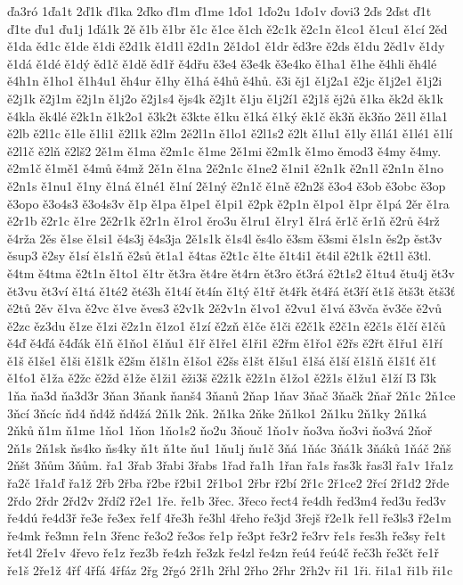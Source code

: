 {ďa3ró
1ďa1t
2ď1k
ď1ka
2ďko
ď1m
ď1me
1ďo1
1ďo2u
1ďo1v
ďovi3
2ďs
2ďst
ď1t
ď1te
ďu1
ďu1j
1ďá1k
2ě
ě1b
ě1br
ě1c
ě1ce
ě1ch
ě2c1k
ě2c1n
ě1co1
ě1cu1
ě1cí
2ěd
ě1da
ěd1c
ě1de
ě1di
ě2d1k
ě1d1l
ě2d1n
2ě1do1
ě1dr
ěd3re
ě2ds
ě1du
2ěd1v
ě1dy
ě1dá
ě1dé
ě1dý
ěd1č
ě1dě
ěd1ř
ě4dřu
ě3e4
ě3e4k
ě3e4ko
ě1ha1
ě1he
ě4hli
ěh4lé
ě4h1n
ě1ho1
ě1h4u1
ěh4ur
ě1hy
ě1há
ě4hů
ě4hů.
ě3i
ěj1
ě1j2a1
ě2jc
ě1j2e1
ě1j2i
ě2j1k
ě2j1m
ě2j1n
ě1j2o
ě2j1s4
ějs4k
ě2j1t
ě1ju
ě1j2í1
ě2j1š
ěj2ů
ě1ka
ěk2d
ěk1k
ě4kla
ěk4lé
ě2k1n
ě1k2o1
ě3k2t
ě3kte
ě1ku
ě1ká
ě1ký
ěk1č
ěk3ň
ěk3ňo
2ě1l
ě1la1
ě2lb
ě2l1c
ě1le
ě1li1
ě2l1k
ě2lm
2ě2l1n
ě1lo1
ě2l1s2
ě2lt
ě1lu1
ě1ly
ě1lá1
ě1lé1
ě1lí
ě2l1č
ě2lň
ě2lš2
2ě1m
ě1ma
ě2m1c
ě1me
2ě1mi
ě2m1k
ě1mo
ěmod3
ě4my
ě4my.
ě2m1č
ě1mě1
ě4mů
ě4mž
2ě1n
ě1na
2ě2n1c
ě1ne2
ě1ni1
ě2n1k
ě2n1l
ě2n1n
ě1no
ě2n1s
ě1nu1
ě1ny
ě1ná
ě1né1
ě1ní
2ě1ný
ě2n1č
ě1ně
ě2n2š
ě3o4
ě3ob
ě3obc
ě3op
ě3opo
ě3o4s3
ě3o4s3v
ě1p
ě1pa
ě1pe1
ě1pi1
ě2pk
ě2p1n
ě1po1
ě1pr
ě1pá
2ěr
ě1ra
ě2r1b
ě2r1c
ě1re
2ě2r1k
ě2r1n
ě1ro1
ěro3u
ě1ru1
ě1ry1
ě1rá
ěr1č
ěr1ň
ě2rů
ě4rž
ě4rža
2ěs
ě1se
ě1si1
ě4s3j
ě4s3ja
2ě1s1k
ě1s4l
ěs4lo
ě3sm
ě3smi
ě1s1n
ěs2p
ěst3v
ěsup3
ě2sy
ě1sí
ě1s1ň
ě2sů
ět1a1
ě4tas
ě2t1c
ě1te
ě1t4i1
ět4il
ě2t1k
ě2t1l
ě3tl.
ě4tm
ě4tma
ě2t1n
ě1to1
ě1tr
ět3ra
ět4re
ět4rn
ět3ro
ět3rá
ě2t1s2
ě1tu4
ětu4j
ět3v
ět3vu
ět3ví
ě1tá
ě1té2
ěté3h
ě1t4í
ět4ín
ě1tý
ě1tř
ět4řk
ět4řá
ět3ří
ět1š
ětš3t
ětš3ť
ě2tů
2ěv
ě1va
ě2vc
ě1ve
ěves3
ě2v1k
2ě2v1n
ě1vo1
ě2vu1
ě1vá
ě3vča
ěv3če
ě2vů
ě2zc
ěz3du
ě1ze
ě1zi
ě2z1n
ě1zo1
ě1zí
ě2zň
ě1če
ě1či
ě2č1k
ě2č1n
ě2č1s
ě1čí
ě1čů
ě4ď
ě4ďá
ě4ďák
ě1ň
ě1ňo1
ě1ňu1
ě1ř
ě1ře1
ě1ři1
ě2řm
ě1řo1
ě2řs
ě2řt
ě1řu1
ě1ří
ě1š
ě1še1
ě1ši
ě1š1k
ě2šm
ě1š1n
ě1šo1
ě2šs
ě1št
ě1šu1
ě1šá
ě1ší
ě1š1ň
ě1š1ť
ě1ť
ě1ťo1
ě1ža
ě2žc
ě2žd
ě1že
ě1ži1
ěži3š
ě2ž1k
ě2ž1n
ě1žo1
ě2ž1s
ě1žu1
ě1ží
ľ3
ľ3k
1ňa
ňa3d
ňa3d3r
3ňan
3ňank
ňanš4
3ňanů
2ňap
1ňav
3ňač
3ňačk
2ňař
2ň1c
2ň1ce
3ňcí
3ňcíc
ňd4
ňd4ž
ňd4žá
2ň1k
2ňk.
2ň1ka
2ňke
2ň1ko1
2ň1ku
2ň1ky
2ň1ká
2ňků
ň1m
ň1me
1ňo1
1ňon
1ňo1s2
ňo2u
3ňouč
1ňo1v
ňo3va
ňo3vi
ňo3vá
2ňoř
2ň1s
2ň1sk
ňs4ko
ňs4ky
ň1t
ň1te
ňu1
1ňu1j
ňu1č
3ňá
1ňác
3ňá1k
3ňáků
1ňáč
2ňš
2ňšt
3ňům
3ňům.
řa1
3řab
3řabi
3řabs
1řad
řa1h
1řan
řa1s
řas3k
řas3l
řa1v
1řa1z
řa2č
1řa1ď
řa1ž
2řb
2řba
ř2be
ř2bi1
2ř1bo1
2řbr
ř2bí
2ř1c
2ř1ce2
2řcí
2ř1d2
2řde
2řdo
2řdr
2řd2v
2řdí2
ř2e1
1ře.
ře1b
3řec.
3řeco
řect4
ře4dh
řed3m4
řed3u
řed3v
ře4dú
ře4d3ř
ře3e
ře3ex
ře1f
4ře3h
ře3hl
4řeho
ře3jd
3řejš
ř2e1k
ře1l
ře3ls3
ř2e1m
ře4mk
ře3mn
ře1n
3řenc
ře3o2
ře3os
ře1p
ře3pt
ře3r2
ře3rv
ře1s
řes3h
ře3sy
ře1t
řet4l
2ře1v
4řevo
ře1z
řez3b
ře4zh
ře3zk
ře4zl
ře4zn
řeú4
řeú4č
řeč3h
ře3čt
ře1ř
ře1š
2ře1ž
4řf
4řfá
4řfáz
2řg
2řgó
2ř1h
2řhl
2řho
2řhr
2řh2v
ři1
1ři.
ři1a1
ři1b
ři1c
}
